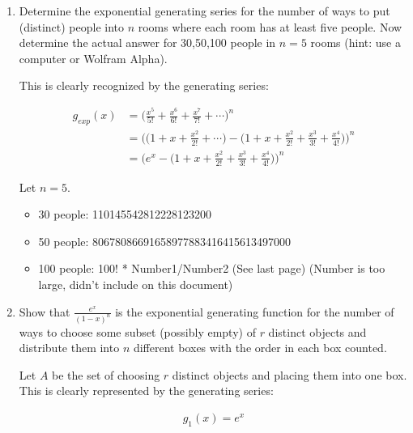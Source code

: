\documentclass{report}
\begin{document}
{\begin{enumerate}
          We are solving for $[x^n]g_{exp}(x)$.

          \begin{align*}
              [x^n]g(x) = \frac{5^n + 1 - 2\cdot 3^n}{4}
          \end{align*}

    \item Determine the exponential generating series for the number of ways to put (distinct) people into $n$ rooms where each room has at least five people. Now determine the actual answer for 30,50,100 people in $n=5$ rooms (hint: use a computer or Wolfram Alpha).

          This is clearly recognized by the generating series:

          \begin{align*}
              g_{exp}(x) & = \Big ( \frac{x^5}{5!} + \frac{x^6}{6!} + \frac{x^7}{7!} + \cdots \Big )^n                                                              \\
                         & = \Bigg ( \Big ( 1 + x + \frac{x^2}{2!} + \cdots \Big ) - \Big (1 + x + \frac{x^2}{2!} + \frac{x^3}{3!} + \frac{x^4}{4!}\Big ) \Bigg )^n \\
                         & = \Bigg ( e^{x} - \Big (1 + x + \frac{x^2}{2!} + \frac{x^3}{3!} + \frac{x^4}{4!}\Big ) \Bigg )^n
          \end{align*}

          Let $n=5$. \begin{itemize}
              \item 30 people: 110145542812228123200
              \item 50 people: 80678086691658977883416415613497000
              \item 100 people: 100! * Number1/Number2 (See last page) (Number is too large, didn't include on this document)
          \end{itemize}

    \item Show that $\frac{e^x}{(1-x)^n}$ is the exponential generating function for the number of ways to choose some subset (possibly empty) of $r$ distinct objects and distribute them into $n$ different boxes with the order in each box counted.

          Let $A$ be the set of choosing $r$ distinct objects and placing them into one box. This is clearly represented by the generating series:

          \begin{align*}
              g_1(x) = e^x
          \end{align*}


\end{enumerate}}
\end{document}
